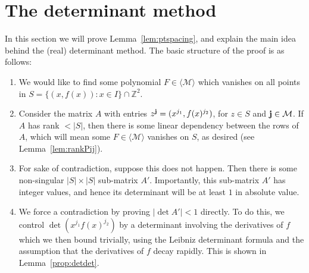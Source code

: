 \documentclass[12pt]{amsart}
\newcommand{\1}{{\mathbf 1}}
\theoremstyle{remark}
\theoremstyle{definition}
\begin{document}
\section{The determinant method} \label{sec:detmethod}
In this section we will prove Lemma~\ref{lem:ptspacing}, and explain the main idea behind the (real) determinant method. The basic structure of the proof is as follows:
\begin{enumerate}
\item[(0)] We would like to find some polynomial $F\in \langle \mathcal{M}\rangle$ which vanishes on all points in $S=\{(x,f(x)): x\in I\}\cap \mathbb{Z}^2$.
\item Consider the matrix $A$ with entries $z^{\bf j}=(x^{j_1},f(x)^{j_2})$, for $z\in S$ and ${\bf j}\in \mathcal{M}$. If $A$ has rank $<\lvert S\rvert$, then there is some linear dependency between the rows of $A$, which will mean some $F\in \langle \mathcal{M}\rangle$ vanishes on $S$, as desired (see Lemma~\ref{lem:rankPij}). 
\item For sake of contradiction, suppose this does not happen. Then there is some non-singular $\lvert S\rvert\times \lvert S\rvert$ sub-matrix $A'$. Importantly, this sub-matrix $A'$ has integer values, and hence its determinant will be at least $1$ in absolute value.
\item We force a contradiction by proving $|\det A'|<1$ directly. To do this, we control $\det(x^{j_1}f(x)^{j_2})$ by a determinant involving the derivatives of $f$ which we then bound trivially, using the Leibniz determinant formula and the assumption that the derivatives of $f$ decay rapidly. This is shown in Lemma~\ref{prop:detdet}.
\end{enumerate}
\end{document}
